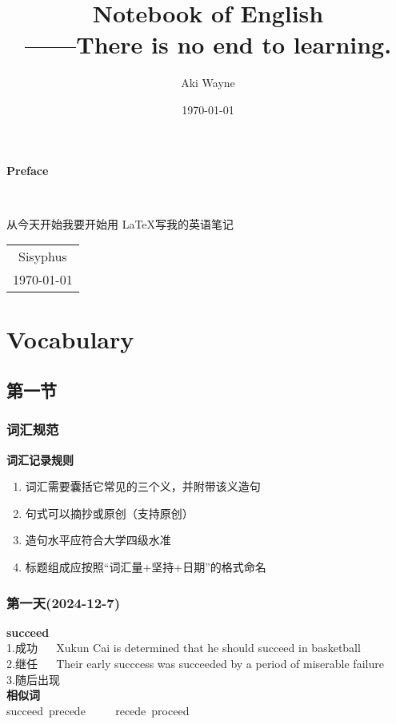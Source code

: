 \documentclass[12pt,a4paper,oneside]{ctexbook} %
\title{\textbf{Notebook of English} \\ ——There is no end to learning.}
\author{Aki Wayne}
\date{\today}
\begin{document}
\maketitle

\frontmatter

\pagestyle{fancy}
\setcounter{page}{1}
\begin{center}
    \Huge{\textbf{Preface}}
\end{center}~\

从今天开始我要开始用 \LaTeX 写我的英语笔记
~\\
\begin{flushright}
    \begin{tabular}{c}
        Sisyphus\\
        \today
    \end{tabular}
\end{flushright}

\newpage

\setcounter{page}{1}
\tableofcontents

\newpage

\chapter{Vocabulary}
\section{第一节}

\subsection{词汇规范}
\begin{center}
\large\textbf{词汇记录规则}\\
\end{center}

\begin{enumerate}
    \item 词汇需要囊括它常见的三个义，并附带该义造句
    \item 句式可以摘抄或原创（支持原创）
    \item 造句水平应符合大学四级水准
    \item 标题组成应按照“词汇量+坚持+日期”的格式命名

\end{enumerate}

\subsection{第一天(2024-12-7)}
\textbf{succeed} \\
1.成功 ~~ Xukun Cai is determined that he should succeed in basketball \\
2.继任 ~~ Their early succcess was succeeded by a period of miserable failure \\
3.随后出现 ~~
~\\
\textbf{相似词} ~\\
succeed~precede ~~~~ recede~proceed
\end{document}
